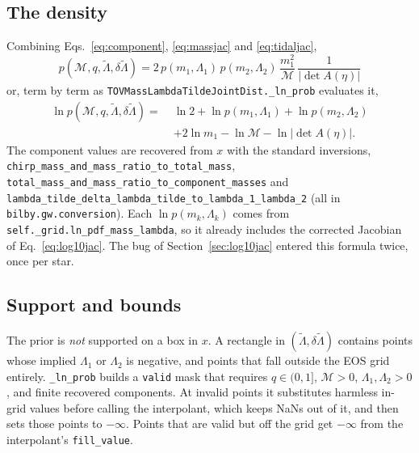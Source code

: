 \documentclass[11pt,a4paper]{article}
\newcommand{\Mc}{\mathcal{M}}
\newcommand{\lt}{\tilde{\Lambda}}
\newcommand{\dlt}{\delta\tilde{\Lambda}}
\newcommand{\code}[1]{\texttt{#1}}
\begin{document}
\subsection{The density}
\label{sec:binary_density}

Combining Eqs.~\eqref{eq:component}, \eqref{eq:massjac} and \eqref{eq:tidaljac},
\begin{equation}
  \boxed{\;
  p(\Mc, q, \lt, \dlt)
  = 2\, p(m_1, \Lambda_1)\, p(m_2, \Lambda_2)\,
    \frac{m_1^2}{\Mc}\, \frac{1}{\lvert \det A(\eta) \rvert}
  \;}
\end{equation}
or, term by term as \code{TOVMassLambdaTildeJointDist.\_ln\_prob} evaluates it,
\begin{align}
  \ln p(\Mc, q, \lt, \dlt) =\;&
    \ln 2
    + \ln p(m_1, \Lambda_1) + \ln p(m_2, \Lambda_2) \nonumber \\
    &+ 2\ln m_1 - \ln \Mc
    - \ln\big\lvert \det A(\eta) \big\rvert .
  \label{eq:binary_lnprob}
\end{align}
The component values are recovered from $x$ with the standard inversions,
\code{chirp\_mass\_and\_mass\_ratio\_to\_total\_mass},
\code{total\_mass\_and\_mass\_ratio\_to\_component\_masses} and
\code{lambda\_tilde\_delta\_lambda\_tilde\_to\_lambda\_1\_lambda\_2} (all in
\code{bilby.gw.conversion}). Each $\ln p(m_k, \Lambda_k)$ comes from
\code{self.\_grid.ln\_pdf\_mass\_lambda}, so it already includes the corrected
Jacobian of Eq.~\eqref{eq:log10jac}. The bug of Section~\ref{sec:log10jac}
entered this formula twice, once per star.

\subsection{Support and bounds}
\label{sec:support}

The prior is \emph{not} supported on a box in $x$. A rectangle in
$(\lt, \dlt)$ contains points whose implied $\Lambda_1$ or $\Lambda_2$ is
negative, and points that fall outside the EOS grid entirely.
\code{\_ln\_prob} builds a \code{valid} mask that requires $q \in (0, 1]$,
$\Mc > 0$, $\Lambda_1, \Lambda_2 > 0$, and finite recovered components. At
invalid points it substitutes harmless in-grid values before calling the
interpolant, which keeps NaNs out of it, and then sets those points to
$-\infty$. Points that are valid but off the grid get $-\infty$ from the
interpolant's \code{fill\_value}.
\end{document}
